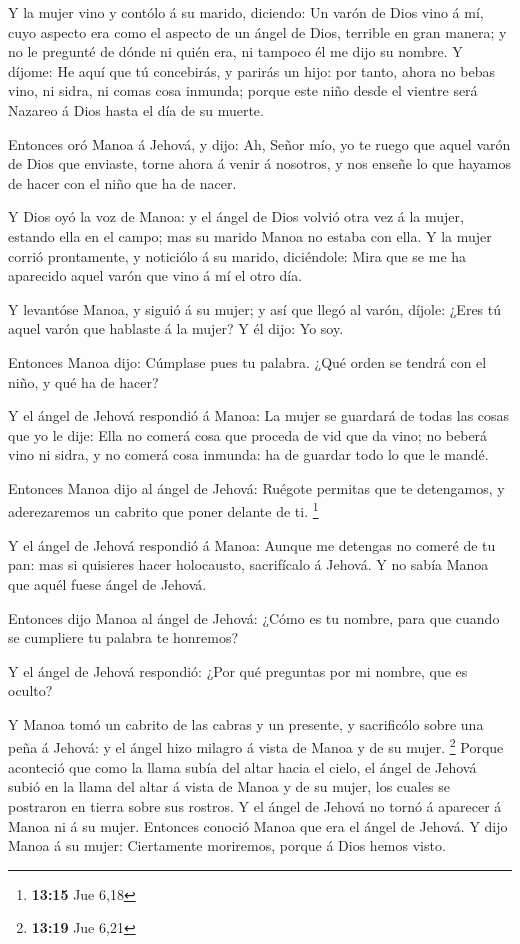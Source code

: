 Y la mujer vino y contólo á su marido, diciendo: Un varón
de Dios vino á mí, cuyo aspecto era como el aspecto de un ángel de Dios,
terrible en gran manera; y no le pregunté de dónde ni quién era, ni
tampoco él me dijo su nombre.  Y díjome: He aquí que tú
concebirás, y parirás un hijo: por tanto, ahora no bebas vino, ni sidra,
ni comas cosa inmunda; porque este niño desde el vientre será Nazareo á
Dios hasta el día de su muerte.

 Entonces oró Manoa á Jehová, y dijo: Ah, Señor mío, yo te
ruego que aquel varón de Dios que enviaste, torne ahora á venir á
nosotros, y nos enseñe lo que hayamos de hacer con el niño que ha de
nacer.

 Y Dios oyó la voz de Manoa: y el ángel de Dios volvió
otra vez á la mujer, estando ella en el campo; mas su marido Manoa no
estaba con ella.  Y la mujer corrió prontamente, y
noticiólo á su marido, diciéndole: Mira que se me ha aparecido aquel
varón que vino á mí el otro día.

 Y levantóse Manoa, y siguió á su mujer; y así que llegó
al varón, díjole: ¿Eres tú aquel varón que hablaste á la mujer? Y él
dijo: Yo soy.

 Entonces Manoa dijo: Cúmplase pues tu palabra. ¿Qué
orden se tendrá con el niño, y qué ha de hacer?

 Y el ángel de Jehová respondió á Manoa: La mujer se
guardará de todas las cosas que yo le dije:  Ella no
comerá cosa que proceda de vid que da vino; no beberá vino ni sidra, y
no comerá cosa inmunda: ha de guardar todo lo que le mandé.

 Entonces Manoa dijo al ángel de Jehová: Ruégote permitas
que te detengamos, y aderezaremos un cabrito que poner delante de ti.
\footnote{\textbf{13:15} Jue 6,18}

 Y el ángel de Jehová respondió á Manoa: Aunque me
detengas no comeré de tu pan: mas si quisieres hacer holocausto,
sacrifícalo á Jehová. Y no sabía Manoa que aquél fuese ángel de Jehová.

 Entonces dijo Manoa al ángel de Jehová: ¿Cómo es tu
nombre, para que cuando se cumpliere tu palabra te honremos?

 Y el ángel de Jehová respondió: ¿Por qué preguntas por
mi nombre, que es oculto?

 Y Manoa tomó un cabrito de las cabras y un presente, y
sacrificólo sobre una peña á Jehová: y el ángel hizo milagro á vista de
Manoa y de su mujer. \footnote{\textbf{13:19} Jue 6,21} 
Porque aconteció que como la llama subía del altar hacia el cielo, el
ángel de Jehová subió en la llama del altar á vista de Manoa y de su
mujer, los cuales se postraron en tierra sobre sus rostros.
 Y el ángel de Jehová no tornó á aparecer á Manoa ni á su
mujer. Entonces conoció Manoa que era el ángel de Jehová.
 Y dijo Manoa á su mujer: Ciertamente moriremos, porque á
Dios hemos visto.

